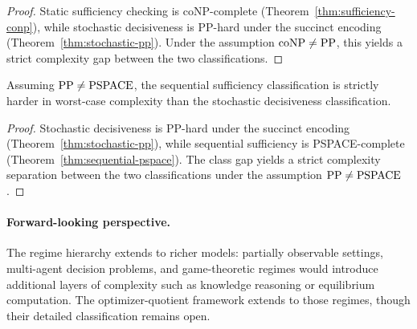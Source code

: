 \begin{proof}
Static sufficiency checking is coNP-complete (Theorem~\ref{thm:sufficiency-conp}), while stochastic decisiveness is PP-hard under the succinct encoding (Theorem~\ref{thm:stochastic-pp}). Under the assumption $\mathrm{coNP} \ne \mathrm{PP}$, this yields a strict complexity gap between the two classifications.
\end{proof}

\begin{theorem}\label{thm:stochastic-sequential-strict}
Assuming $\mathrm{PP} \ne \mathrm{PSPACE}$, the sequential sufficiency classification is strictly harder in worst-case complexity than the stochastic decisiveness classification.
\end{theorem}


\begin{proof}
Stochastic decisiveness is PP-hard under the succinct encoding (Theorem~\ref{thm:stochastic-pp}), while sequential sufficiency is PSPACE-complete (Theorem~\ref{thm:sequential-pspace}). The class gap yields a strict complexity separation between the two classifications under the assumption $\mathrm{PP} \ne \mathrm{PSPACE}$.
\end{proof}


\paragraph{Forward-looking perspective.}
The regime hierarchy extends to richer models: partially observable settings, multi-agent decision problems, and game-theoretic regimes would introduce additional layers of complexity such as knowledge reasoning or equilibrium computation. The optimizer-quotient framework extends to those regimes, though their detailed classification remains open.
